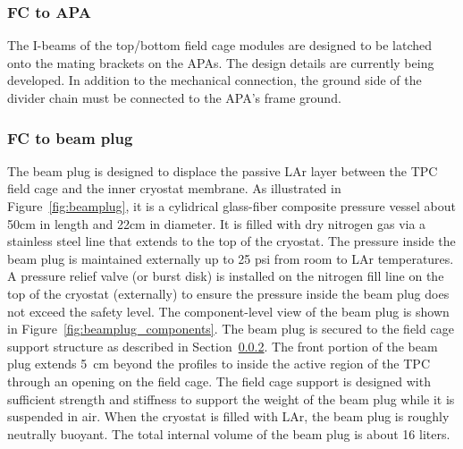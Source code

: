 \subsubsection{FC to APA}

The I-beams of the top/bottom field cage modules are designed to be latched onto the mating brackets on the APAs.  The design details are currently being developed.   
In addition to the mechanical connection, the ground side of the divider chain must be connected to the APA's frame ground. 


\subsubsection{FC to beam plug}
\label{subsec:fc-beamplug}

The beam plug is designed to displace the passive LAr layer between the TPC field cage and the inner cryostat membrane. 
As illustrated in Figure~\ref{fig:beamplug}, it is a cylidrical glass-fiber composite pressure vessel about 50cm in length and  22cm in diameter. It is filled with dry nitrogen gas via a stainless steel line that extends to the top of the cryostat. The pressure inside the beam plug is maintained externally up to 25 psi from room to LAr temperatures. A pressure relief valve (or burst disk) is installed on the nitrogen fill line on the top of the cryostat (externally) to ensure the pressure inside the beam plug does not exceed the safety level. The component-level view of the beam plug is shown in Figure~\ref{fig:beamplug_components}.  The beam plug is secured to the field cage support structure as described in Section~\ref{subsec:fc-beamplug}. The front portion of the beam plug extends 5~cm beyond the profiles to inside the active region of the TPC through an opening on the field cage. The field cage support is designed with sufficient strength and stiffness to support the weight of the beam plug while it is suspended in air. 
When the cryostat is filled with LAr, the beam plug is roughly neutrally buoyant.  The total internal volume of the beam plug is about 16 liters. 

